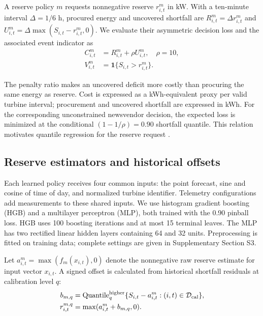 A reserve policy $m$ requests nonnegative reserve $r^m_{i,t}$ in kW. With a ten-minute interval $\Delta=1/6$ h, procured energy and uncovered shortfall are $R^m_{i,t}=\Delta r^m_{i,t}$ and $U^m_{i,t}=\Delta\max(S_{i,t}-r^m_{i,t},0)$. We evaluate their asymmetric decision loss and the associated event indicator as
\begin{equation}
 \begin{aligned}
 C^m_{i,t}&=R^m_{i,t}+\rho U^m_{i,t},\quad \rho=10,\\
 V^m_{i,t}&=\mathbf{1}\{S_{i,t}>r^m_{i,t}\}.
 \end{aligned}
\label{eq:loss}
\end{equation}

The penalty ratio makes an uncovered deficit more costly than procuring the same energy as reserve. Cost is expressed as a kWh-equivalent proxy per valid turbine interval; procurement and uncovered shortfall are expressed in kWh. For the corresponding unconstrained newsvendor decision, the expected loss is minimized at the conditional $(1-1/\rho)=0.90$ shortfall quantile. This relation motivates quantile regression for the reserve request \cite{koenker1978regression,soares2016}.

\subsection{Reserve estimators and historical offsets}
Each learned policy receives four common inputs: the point forecast, sine and cosine of time of day, and normalized turbine identifier. Telemetry configurations add measurements to these shared inputs. We use histogram gradient boosting (HGB) and a multilayer perceptron (MLP), both trained with the 0.90 pinball loss. HGB uses 100 boosting iterations and at most 15 terminal leaves. The MLP has two rectified linear hidden layers containing 64 and 32 units. Preprocessing is fitted on training data; complete settings are given in Supplementary Section S3.

Let $a^m_{i,t}=\max(f_m(x_{i,t}),0)$ denote the nonnegative raw reserve estimate for input vector $x_{i,t}$. A signed offset is calculated from historical shortfall residuals at calibration level $q$:
\begin{equation}
 \begin{aligned}
 b_{m,q}&=\operatorname{Quantile}^{\mathrm{higher}}_q
 \{S_{i,t}-a^m_{i,t}:(i,t)\in\mathcal D_{\rm cal}\},\\
 r^{m,q}_{i,t}&=\max(a^m_{i,t}+b_{m,q},0).
 \end{aligned}
\label{eq:offset}
\end{equation}

